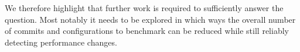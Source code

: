 \documentclass[	runningheads,
				a4paper]{llncs}
\begin{document}
We therefore highlight that further work is required to sufficiently answer the question. Most notably it needs to be explored in which ways the overall number of commits and configurations to benchmark can be reduced while still reliably detecting performance changes.
	
	
	
	
	
\end{document}
